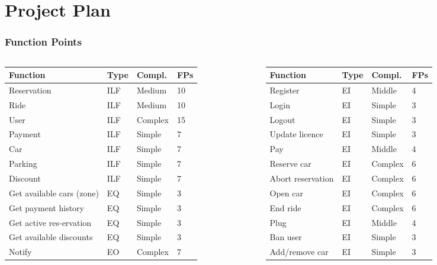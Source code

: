 \section{Project Plan}

\begin{frame}
	\frametitle{Function Points}
	\begin{columns}
		\begin{table}[H]
			\footnotesize
			\centering
			\begin{tabular}{|p{2cm}|p{0.6cm}|p{1.1cm}|p{0.45cm}|}
				\hline
				Function & Type & Compl. & FPs \\
				\hline
				Reservation & ILF & Medium & 10 \\
				Ride & ILF & Medium & 10 \\
				User & ILF & Complex & 15 \\
				Payment & ILF & Simple & 7 \\
				Car & ILF & Simple & 7 \\
				Parking & ILF & Simple & 7 \\
				Discount & ILF & Simple & 7 \\
				Get available cars (zone) & EQ & Simple & 3 \\
				Get payment history & EQ & Simple & 3 \\
				Get active res-ervation & EQ & Simple & 3 \\
				Get available discounts & EQ & Simple & 3 \\
				Notify & EO & Complex & 7 \\
				\hline
			\end{tabular}
		\end{table}
		\begin{table}[H]
			\footnotesize
			\centering
			\begin{tabular}{|p{2cm}|p{0.6cm}|p{1.1cm}|p{0.45cm}|}
				\hline
				Function & Type & Compl. & FPs \\
				\hline
				Register & EI & Middle & 4 \\
				Login & EI & Simple & 3 \\
				Logout & EI & Simple & 3 \\
				Update licence & EI & Simple & 3 \\
				Pay & EI & Middle & 4 \\
				Reserve car & EI & Complex & 6 \\
				Abort reservation & EI & Complex & 6 \\
				Open car & EI & Complex & 6 \\
				End ride & EI & Complex & 6 \\
				Plug & EI & Middle & 4 \\
				Ban user & EI & Simple & 3 \\
				Add/remove car & EI & Simple & 3 \\\hline
			\end{tabular}
		\end{table}
	\end{columns}
\end{frame}

